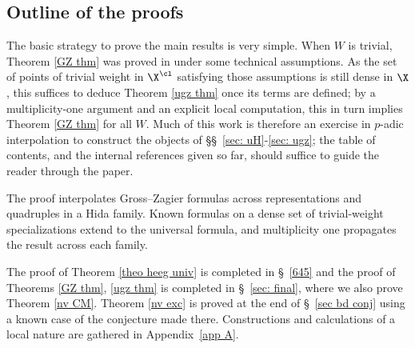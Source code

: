



































\subsection{Outline  of  the proofs} The basic  strategy to prove the main results is very simple. When $W$ is trivial, Theorem \ref{GZ thm} was proved  in \cite{dd-pyzz,nonsplit} under some technical assumptions. As the set of points of trivial weight in $\X^{\cl}$ satisfying those assumptions is still dense in $\X$, this suffices to deduce Theorem \ref{ugz thm} once its terms are defined; by a multiplicity-one argument and an explicit local  computation, this in turn implies Theorem \ref{GZ thm} for all $W$.
Much of this work is therefore  an exercise in $p$-adic interpolation to construct the objects  of   \S\S~\ref{sec: uH}-\ref{sec: ugz};
 the table of contents, and the internal references given so far, should suffice to guide the reader through the paper.

\begin{remark}
The proof interpolates Gross--Zagier formulas across representations and
quadruples in a Hida family. Known formulas on a dense set of trivial-weight
specializations extend to the universal formula, and multiplicity one
propagates the result across each family.
\end{remark}

 The proof of Theorem \ref{theo heeg univ} is completed in \S~\ref{645} and the proof of Theorems \ref{GZ thm}, \ref{ugz thm} is completed in  \S~\ref{sec: final}, where we also prove Theorem \ref{nv CM}. Theorem  \ref{nv exc} is proved  at the end of  \S~\ref{sec bd conj} using a known case of the conjecture made there.  Constructions and calculations of a local nature are gathered in  Appendix~\ref{app A}.



